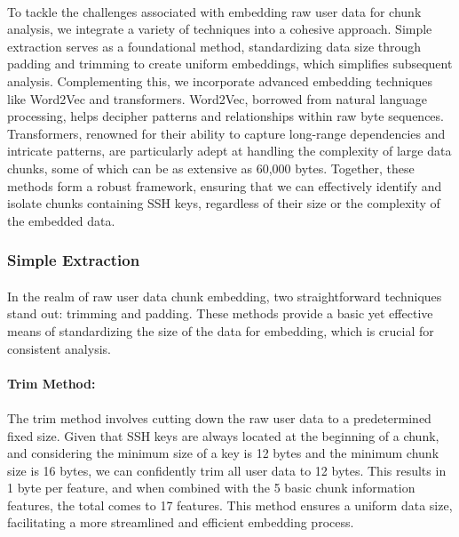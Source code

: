     \paragraph{}To tackle the challenges associated with embedding raw user data for chunk analysis, we integrate a variety of techniques into a cohesive approach. Simple extraction serves as a foundational method, standardizing data size through padding and trimming to create uniform embeddings, which simplifies subsequent analysis. Complementing this, we incorporate advanced embedding techniques like Word2Vec and transformers. Word2Vec, borrowed from natural language processing, helps decipher patterns and relationships within raw byte sequences. Transformers, renowned for their ability to capture long-range dependencies and intricate patterns, are particularly adept at handling the complexity of large data chunks, some of which can be as extensive as 60,000 bytes. Together, these methods form a robust framework, ensuring that we can effectively identify and isolate chunks containing SSH keys, regardless of their size or the complexity of the embedded data.

    \subsubsection{Simple Extraction}
        \paragraph{}In the realm of raw user data chunk embedding, two straightforward techniques stand out: trimming and padding. These methods provide a basic yet effective means of standardizing the size of the data for embedding, which is crucial for consistent analysis.
        
        \paragraph{Trim Method:}\label{sec:embedding:trim_method}
        \paragraph{}The trim method involves cutting down the raw user data to a predetermined fixed size. Given that SSH keys are always located at the beginning of a chunk, and considering the minimum size of a key is 12 bytes and the minimum chunk size is 16 bytes, we can confidently trim all user data to 12 bytes. This results in 1 byte per feature, and when combined with the 5 basic chunk information features, the total comes to 17 features. This method ensures a uniform data size, facilitating a more streamlined and efficient embedding process.
        
